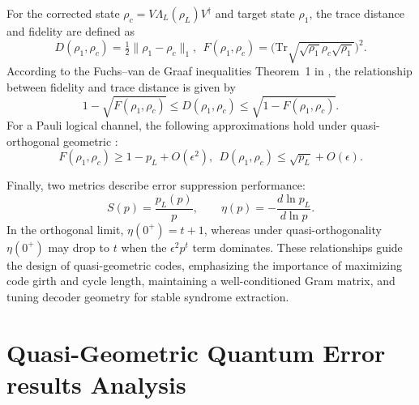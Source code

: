 \documentclass{iopjournal}
\theoremstyle{thmstyleone}%
\theoremstyle{thmstyletwo}%
\theoremstyle{thmstylethree}%
\begin{document}
For the corrected state $\rho_c=V\Lambda_L(\rho_L)V^\dagger$ and target state $\rho_1$, the trace distance and fidelity are defined as
\begin{equation}
D(\rho_1,\rho_c)=\tfrac12\|\rho_1-\rho_c\|_1,~~ %
F(\rho_1,\rho_c)=\bigl(\mathrm{Tr}\sqrt{\sqrt{\rho_1}\rho_c\sqrt{\rho_1}}\bigr)^2.\label{fidelity, trace didtance}
\end{equation}
According to the Fuchs–van de Graaf inequalities Theorem~1 in \cite{Fuchs2002cryptographic}, the relationship between fidelity and trace distance is given by
\begin{equation}
1 - \sqrt{F(\rho_1,\rho_c)} \le D(\rho_1,\rho_c) \le \sqrt{1 - F(\rho_1,\rho_c)}.\label{relat F D}
\end{equation}
For a Pauli logical channel, the following approximations hold under quasi-orthogonal geometric :
\begin{equation}
F(\rho_1,\rho_c)\ge 1-p_L+O(\epsilon^2), ~~
D(\rho_1,\rho_c)\le \sqrt{p_L}+O(\epsilon).
\end{equation}

Finally, two metrics describe error suppression performance:
\begin{equation}
S(p)=\frac{p_L(p)}{p}, \qquad
\eta(p)=-\frac{d\ln p_L}{d\ln p}.
\end{equation}
In the orthogonal limit, $\eta(0^+)=t+1$, whereas under quasi-orthogonality 
$\eta(0^+)$ may drop to $t$ when the $\epsilon^2p^t$ term dominates.  These relationships guide the design of quasi-geometric codes, emphasizing the 
importance of maximizing code girth and cycle length, maintaining a well-conditioned 
Gram matrix, and tuning decoder geometry for stable syndrome extraction.



 \section{Quasi-Geometric Quantum Error results Analysis}\label{Section III}
\end{document}
